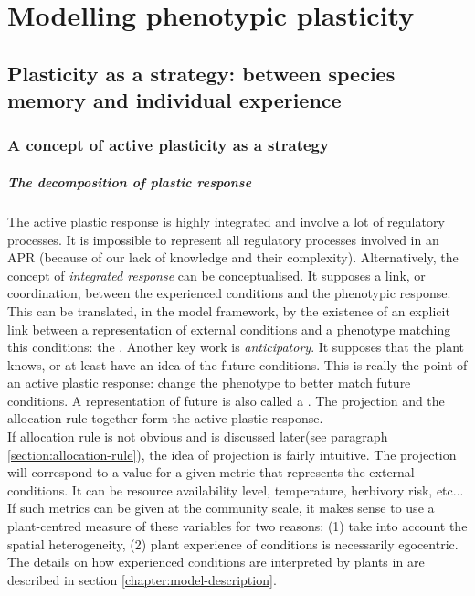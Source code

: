 \chapter{Modelling phenotypic plasticity}\label{chapter:modelling_PP}


\section{Plasticity as a strategy: between species memory and individual experience}

\subsection{A concept of active plasticity as a strategy}
\paragraph{The decomposition of plastic response}
The active plastic response is highly integrated \parencite{freschet_integrated_2015} and involve a lot of regulatory processes\parencite{nicotra_adaptive_2010}. It is impossible to represent all regulatory processes involved in an APR (because of our lack of knowledge and their complexity). Alternatively, the concept of \textit{integrated response} can be conceptualised. It supposes a link, or coordination, between the experienced conditions and the phenotypic response. This can be translated, in the model framework, by the existence of an explicit link between a representation of external conditions and a phenotype matching this conditions: the . Another key work is \textit{anticipatory}. It supposes that the plant knows, or at least have an idea of the future conditions. This is really the point of an active plastic response: change the phenotype to better match future conditions. A representation of future is also called a . The projection and the allocation rule together form the active plastic response.\\
If allocation rule is not obvious and is discussed later(see paragraph \ref{section:allocation-rule}), the idea of projection is fairly intuitive. The projection will correspond to a value for a given metric that represents the external conditions. It can be resource availability level, temperature, herbivory risk, etc... If such metrics can be given at the community scale, it makes sense to use a plant-centred measure of these variables for two reasons: (1) take into account the spatial heterogeneity, (2) plant experience of conditions is necessarily egocentric. The details on how experienced conditions are interpreted by plants in \model are described in section \ref{chapter:model-description}.

